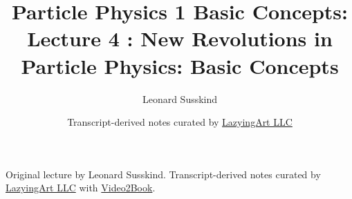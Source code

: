 \documentclass[11pt,oneside]{book}
\begin{document}
\frontmatter
\title{Particle Physics 1 Basic Concepts: Lecture 4 : New Revolutions in Particle Physics: Basic Concepts}
\author{Leonard Susskind}
\date{Transcript-derived notes curated by \href{https://lazying.art}{LazyingArt LLC}}
\maketitle
\begin{center}
\small Original lecture by Leonard Susskind. Transcript-derived notes curated by \href{https://lazying.art}{LazyingArt LLC} with \href{https://github.com/lachlanchen/Video2Book}{Video2Book}.
\end{center}
\clearpage
\mainmatter

\end{document}
